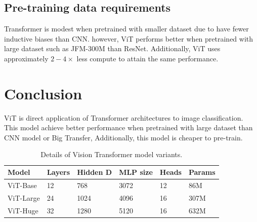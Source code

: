 \documentclass[extendedabs]{bmvc2k}
\begin{document}
\subsection{Pre-training data requirements}
Transformer\cite{attentionneed} is modest when pretrained with smaller dataset due to have fewer inductive biases than CNN. however, ViT performs better when pretrained with large dataset such as JFM-300M than ResNet. Additionally, ViT uses approximately $2-4\times$ less compute to attain the same performance.

\section{Conclusion}
ViT is direct application of Transformer architectures to image classification. This model achieve better performance when pretrained with large dataset than CNN model or Big Transfer\cite{bit}, Additionally, this model is cheaper to pre-train.

\begin{table}[]
\centering
\begin{tabular}{llllll}
\hline
Model     & Layers & Hidden D & MLP size & Heads & Params \\ \hline
ViT-Base  & 12     & 768      & 3072     & 12    & 86M    \\
ViT-Large & 24     & 1024     & 4096     & 16    & 307M   \\
ViT-Huge  & 32     & 1280     & 5120     & 16    & 632M   \\ \hline
\end{tabular}
\caption{Details of Vision Transformer model variants.}
\label{tab:modelvariants}
\end{table}

\newpage

\end{document}
